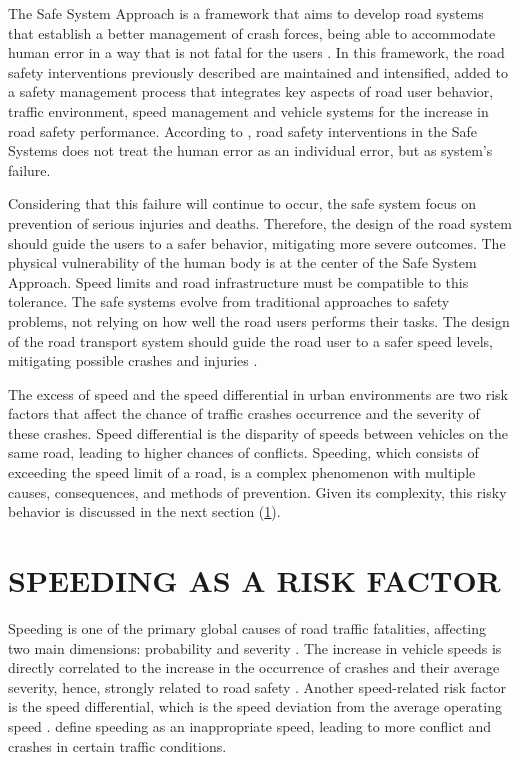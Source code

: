 The Safe System Approach is a framework that aims to develop road systems that establish a better management of crash forces, being able to accommodate human error in a way that is not fatal for the users \cite{international_transport_forum_towards_2008}. In this framework, the road safety interventions previously described are maintained and intensified, added to a safety management process that integrates key aspects of road user behavior, traffic environment, speed management and vehicle systems for the increase in road safety performance. According to \textcite{larssonSafeSystemApproach2013}, road safety interventions in the Safe Systems does not treat the human error as an individual error, but as system's failure. 

Considering that this failure will continue to occur, the safe system focus on prevention of serious injuries and deaths. Therefore, the design of the road system should guide the users to a safer behavior, mitigating more severe outcomes. The physical vulnerability of the human body is at the center of the Safe System Approach. Speed limits and road infrastructure must be compatible to this tolerance. The safe systems evolve from traditional approaches to safety problems, not relying on how well the road users performs their tasks. The design of the road transport system should guide the road user to a safer speed levels, mitigating possible crashes and injuries \cite{international_transport_forum_towards_2008,wegmanFutureRoadSafety2017}. 

The excess of speed and the speed differential in urban environments are two risk factors that affect the chance of traffic crashes occurrence and the severity of these crashes. Speed differential is the disparity of speeds between vehicles on the same road, leading to higher chances of conflicts. Speeding, which consists of exceeding the speed limit of a road, is a complex phenomenon with multiple causes, consequences, and methods of prevention. Given its complexity, this risky behavior is discussed in the next section (\ref{speeding}). 

\section{SPEEDING AS A RISK FACTOR} \label{speeding}

Speeding is one of the primary global causes of road traffic fatalities, affecting two main dimensions: probability and severity \cite{WHO2013}. The increase in vehicle speeds is directly correlated to the increase in the occurrence of crashes and their average severity, hence, strongly related to road safety \cite{Mohan2016a}. Another speed-related risk factor is the speed differential, which is the speed deviation from the average operating speed \cite{Shinar2017}. \textcite{Ferraz2012} define speeding as an inappropriate speed, leading to more conflict and crashes in certain traffic conditions. 

